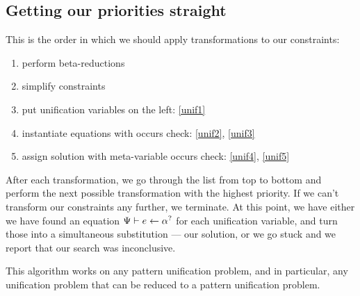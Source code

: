 \documentclass[twoside,12pt,a4paper]{article}
\begin{document}
\subsection{Getting our priorities straight}
This is the order in which we should apply transformations to our constraints:
\begin{enumerate}
    \item perform beta-reductions
    \item simplify constraints
    \item put unification variables on the left: \cref{unif1}
    \item instantiate equations with occurs check: \cref{unif2}, \cref{unif3}
    \item assign solution with meta-variable occurs check: \cref{unif4}, \cref{unif5}
\end{enumerate}
After each transformation, we go through the list from top to bottom and perform the next possible transformation with the highest priority.
If we can't transform our constraints any further, we terminate.
At this point, we have either we have found an equation $\Psi \vdash e \leftarrow \alpha^?$ for each unification variable,
and turn those into a simultaneous substitution --- our solution,
or we go stuck and we report that our search was inconclusive.
\fi

This algorithm works on any pattern unification problem, and in particular, any unification problem that can be reduced to a pattern unification problem. %
\end{document}
